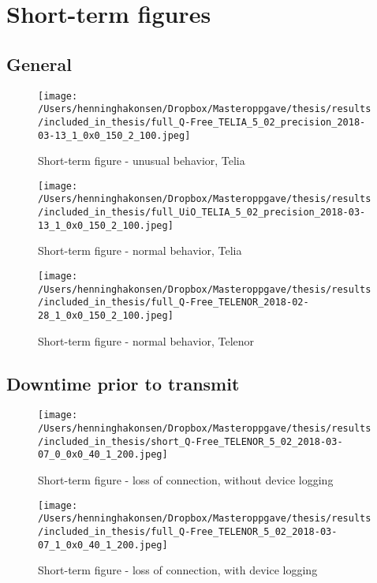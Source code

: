 \documentclass[USenglish]{ifimaster}  %
\begin{document}
\cleardoublepage
\section{Short-term figures}
\subsection{General} \label{ssection:general}
\begin{figure}[H]
  \centering
  \texttt{[image: /Users/henninghakonsen/Dropbox/Masteroppgave/thesis/results/included\_in\_thesis/full\_Q-Free\_TELIA\_5\_02\_precision\_2018-03-13\_1\_0x0\_150\_2\_100.jpeg]}
  \caption{Short-term figure - unusual behavior, Telia}
  \label{figure:2x150_QFREE_TELIA}
\end{figure}

\begin{figure}[H]
  \centering
  \texttt{[image: /Users/henninghakonsen/Dropbox/Masteroppgave/thesis/results/included\_in\_thesis/full\_UiO\_TELIA\_5\_02\_precision\_2018-03-13\_1\_0x0\_150\_2\_100.jpeg]}
  \caption{Short-term figure - normal behavior, Telia}
  \label{figure:2x150_UIO_TELIA}
\end{figure}

\begin{figure}[H]
  \centering
  \texttt{[image: /Users/henninghakonsen/Dropbox/Masteroppgave/thesis/results/included\_in\_thesis/full\_Q-Free\_TELENOR\_2018-02-28\_1\_0x0\_150\_2\_100.jpeg]}
  \caption{Short-term figure - normal behavior, Telenor}
  \label{figure:2x150_QFREE_TELENOR}
\end{figure}

\subsection{Downtime prior to transmit} \label{ssection:downtimeprior}
\begin{figure}[H]
  \centering
  \texttt{[image: /Users/henninghakonsen/Dropbox/Masteroppgave/thesis/results/included\_in\_thesis/short\_Q-Free\_TELENOR\_5\_02\_2018-03-07\_0\_0x0\_40\_1\_200.jpeg]}
  \caption{Short-term figure - loss of connection, without device logging}
  \label{figure:1x40_QFREE_TELENOR_0LOG}
\end{figure}

\begin{figure}[H]
  \centering
  \texttt{[image: /Users/henninghakonsen/Dropbox/Masteroppgave/thesis/results/included\_in\_thesis/full\_Q-Free\_TELENOR\_5\_02\_2018-03-07\_1\_0x0\_40\_1\_200.jpeg]}
  \caption{Short-term figure - loss of connection, with device logging}
  \label{figure:1x40_QFREE_TELENOR_1LOG}
\end{figure}
\end{document}
